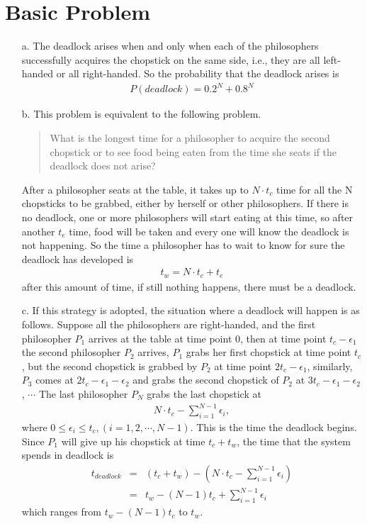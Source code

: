 \documentclass[12pt,letterpaper]{article}
\begin{document}
\section*{Basic Problem}
\begin{itemize}
\item[a.] The deadlock arises when and only when each of the philosophers successfully acquires the chopstick on the same side, i.e., they are all left-handed or all right-handed. So the probability that the deadlock arises is
\begin{align}
P(deadlock) = 0.2^N + 0.8^N
\end{align}
\item[b.] This problem is equivalent to the following problem.
\begin{quote}
What is the longest time for a philosopher to acquire the second chopstick or to see food being eaten from the time she seats if the deadlock does not arise?
\end{quote}
After a philosopher seats at the table, it takes up to $N\cdot t_c$ time for all the N chopsticks to be grabbed, either by herself or other philosophers. If there is no deadlock, one or more philosophers will start eating at this time, so after another $t_e$ time, food will be taken and every one will know the deadlock is not happening. So the time a philosopher has to wait to know for sure the deadlock has developed is
\begin{align}
t_w = N\cdot t_c+t_e
\end{align}
after this amount of time, if still nothing happens, there must be a deadlock.
\item[c.] If this strategy is adopted, the situation where a deadlock will happen is as follows. Suppose all the philosophers are right-handed, and the first philosopher $P_1$ arrives at the table at time point 0, then at time point $t_c-\epsilon_1$ the second philosopher $P_2$ arrives, $P_1$ grabs her first chopstick at time point $t_c$, but the second chopstick is grabbed by $P_2$ at time point $2t_c-\epsilon_1$, similarly, $P_3$ comes at $2t_c-\epsilon_1-\epsilon_2$ and grabs the second chopstick of $P_2$ at $3t_c-\epsilon_1-\epsilon_2$, $\cdots$ The last philosopher $P_N$ grabs the last chopstick at 
\begin{align}
N\cdot t_c-\sum^{N-1}_{i=1}\epsilon_i, 
\end{align}
where $0\le\epsilon_i\le t_c, (i = 1, 2, \cdots, N-1)$. This is the time the deadlock begins. Since $P_1$ will give up his chopstick at time $t_c+t_w$, the time that the system spends in deadlock is
\begin{align}
\nonumber t_{deadlock} & = & (t_c+t_w)-(N\cdot t_c-\sum^{N-1}_{i=1}\epsilon_i)\\
& = & t_w - (N-1)t_c + \sum^{N-1}_{i=1}\epsilon_i
\end{align}
which ranges from $t_w-(N-1)t_c$ to $t_w$.


\end{itemize}
\end{document}
